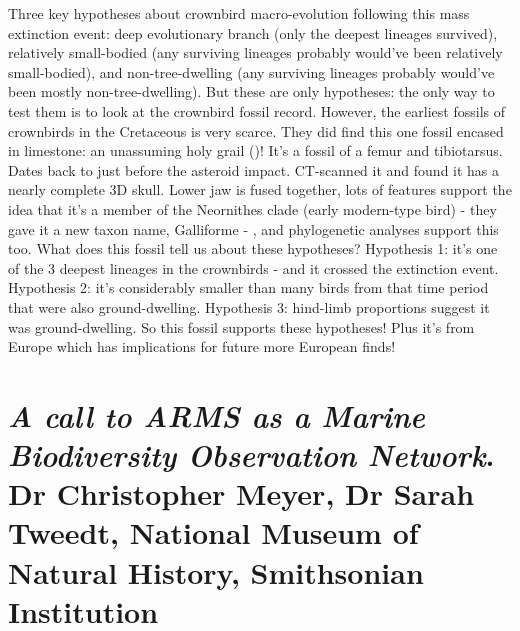\documentclass[9pt]{article}
\begin{document}
	Three key hypotheses about crownbird macro-evolution following this mass extinction event: deep evolutionary branch (only the deepest lineages survived), relatively small-bodied (any surviving lineages probably would've been relatively small-bodied), and non-tree-dwelling (any surviving lineages probably would've been mostly non-tree-dwelling). But these are only hypotheses: the only way to test them is to look at the crownbird fossil record. However, the earliest fossils of crownbirds in the Cretaceous is very scarce. They did find this one fossil encased in limestone: an unassuming holy grail (\cite{field2020late})! It's a fossil of a femur and tibiotarsus. Dates back to just before the asteroid impact. CT-scanned it and found it has a nearly complete 3D skull. Lower jaw is fused together, lots of features support the idea that it's a member of the Neornithes clade (early modern-type bird) - they gave it a new taxon name, Galliforme - , and phylogenetic analyses support this too. What does this fossil tell us about these hypotheses? Hypothesis 1: it's one of the 3 deepest lineages in the crownbirds - and it crossed the extinction event. Hypothesis 2: it's considerably smaller than many birds from that time period that were also ground-dwelling. Hypothesis 3: hind-limb proportions suggest it was ground-dwelling. So this fossil supports these hypotheses! Plus it's from Europe which has implications for future more European finds!


	\section{\textit{A call to ARMS as a Marine Biodiversity Observation Network}. Dr Christopher Meyer, Dr Sarah Tweedt, National Museum of Natural History, Smithsonian Institution}
	
\end{document}
